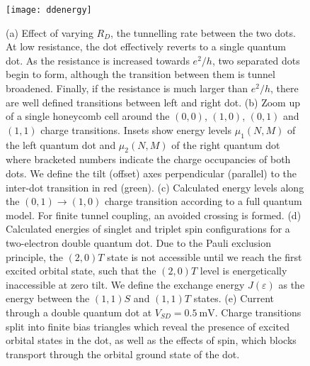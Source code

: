 \begin{figure}
  \texttt{[image: ddenergy]}
  \caption[Energy levels and spin in a double quantum dot]
  {\label{fig:dqdenergy}(a) Effect of varying $R_D$, the tunnelling rate between the two
  dots. At low resistance, the dot effectively reverts to a single quantum dot. As the resistance is increased towards
  $e^2/h$, two separated dots begin to form, although the transition between them is tunnel broadened.
  Finally, if the resistance is much larger than $e^2/h$, there are well defined transitions between left and right
  dot. (b) Zoom up of a single honeycomb cell around the $(0, 0)$, $(1, 0)$, $(0, 1)$ and $(1, 1)$ charge transitions.
  Insets show energy levels $\mu_1(N, M)$ of the left quantum dot and $\mu_2(N, M)$ of the right quantum dot where bracketed
  numbers indicate the charge occupancies of both dots. We define the tilt (offset) axes perpendicular (parallel) to the
  inter-dot transition in red (green). (c) Calculated energy levels along the $(0,1) \rightarrow (1,0)$ charge transition according
  to a full quantum model. For finite tunnel coupling, an avoided crossing is formed. (d) Calculated energies of singlet and
  triplet spin configurations for a two-electron double quantum dot. Due to the Pauli exclusion principle,
  the $(2, 0)T$ state is not accessible until we reach the first excited orbital state, such that the $(2, 0)T$ level is energetically
  inaccessible at zero tilt. We define the exchange energy $J(\varepsilon)$ as the energy between the $(1, 1)S$ and $(1, 1)T$
  states. (e) Current through a double quantum dot at $V_{SD} = \SI{0.5}{\milli\volt}$. Charge transitions split into finite bias triangles
  which reveal the presence of excited orbital states in the dot, as well as the effects of spin, which blocks transport through the orbital ground state of the dot.}
\end{figure}

